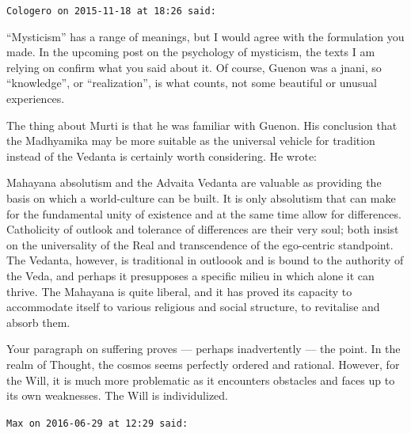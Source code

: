 \begin{footnotesize}
\begin{sffamily}
\hfill

\texttt{Cologero on 2015-11-18 at 18:26 said: }

“Mysticism” has a range of meanings, but I would agree with the formulation you made. In the upcoming post on the
psychology of mysticism, the texts I am relying on confirm what you said about it. Of course, Guenon was a jnani, so
“knowledge”, or “realization”, is what counts, not some beautiful or unusual experiences.

The thing about Murti is that he was familiar with Guenon. His conclusion that the Madhyamika may be more suitable as
the universal vehicle for tradition instead of the Vedanta is certainly worth considering. He wrote:

\begin{quotex}
Mahayana absolutism and the Advaita Vedanta are valuable as providing the basis on which a world-culture can be built.
It is only absolutism that can make for the fundamental unity of existence and at the same time allow for differences.
Catholicity of outlook and tolerance of differences are their very soul; both insist on the universality of the Real
and transcendence of the ego-centric standpoint. The Vedanta, however, is traditional in outloook and is bound to the
authority of the Veda, and perhaps it presupposes a specific milieu in which alone it can thrive. The Mahayana is quite
liberal, and it has proved its capacity to accommodate itself to various religious and social structure, to revitalise
and absorb them. 

\end{quotex}
Your paragraph on suffering proves — perhaps inadvertently — the point. In the realm of Thought,
the cosmos seems perfectly ordered and rational. However, for the Will, it is much more problematic as it encounters
obstacles and faces up to its own weaknesses. The Will is individulized.


\hfill

\texttt{Max on 2016-06-29 at 12:29 said: }


\end{sffamily}
\end{footnotesize}
